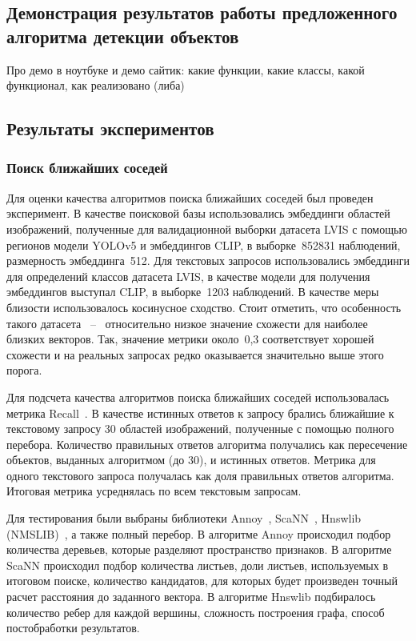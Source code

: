 \documentclass[a4paper,14pt]{article}
\begin{document}
    \subsection{Демонстрация результатов работы предложенного алгоритма детекции объектов}

    Про демо в ноутбуке и демо сайтик: какие функции, какие классы, какой функционал, как реализовано (либа)

    \subsection{Результаты экспериментов}

    \subsubsection{Поиск ближайших соседей}

    Для оценки качества алгоритмов поиска ближайших соседей был проведен эксперимент.
    В качестве поисковой базы использовались эмбеддинги областей изображений, полученные для валидационной выборки датасета LVIS с помощью регионов модели YOLOv5 и эмбеддингов CLIP, в выборке~852831 наблюдений, размерность эмбеддинга~512.
    Для текстовых запросов использовались эмбеддинги для определений классов датасета LVIS, в качестве модели для получения эмбеддингов выступал CLIP, в выборке~1203 наблюдений.
    В качестве меры близости использовалось косинусное сходство.
    Стоит отметить, что особенность такого датасета ~--~ относительно низкое значение схожести для наиболее близких векторов.
    Так, значение метрики около~0,3 соответствует хорошей схожести и на реальных запросах редко оказывается значительно выше этого порога.

    Для подсчета качества алгоритмов поиска ближайших соседей использовалась метрика Recall~\cite{aumuller2020ann}.
    В качестве истинных ответов к запросу брались ближайшие к текстовому запросу 30 областей изображений, полученные с помощью полного перебора.
    Количество правильных ответов алгоритма получались как пересечение объектов, выданных алгоритмом (до 30), и истинных ответов.
    Метрика для одного текстового запроса получалась как доля правильных ответов алгоритма.
    Итоговая метрика усреднялась по всем текстовым запросам.

    Для тестирования были выбраны библиотеки Annoy~\cite{annoy}, ScaNN~\cite{avq_2020}, Hnswlib (NMSLIB)~\cite{malkov2018efficient}, а также полный перебор.
    В алгоритме Annoy происходил подбор количества деревьев, которые разделяют пространство признаков.
    В алгоритме ScaNN происходил подбор количества листьев, доли листьев, используемых в итоговом поиске, количество кандидатов, для которых будет произведен точный расчет расстояния до заданного вектора.
    В алгоритме Hnswlib подбиралось количество ребер для каждой вершины, сложность построения графа, способ постобработки результатов.
\end{document}

